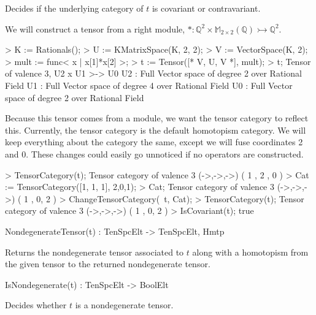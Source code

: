 Decides if the underlying category of $t$ is covariant or contravariant.

\begin{example}[TensorCatProps]

We will construct a tensor from a right module, 
$*:\mathbb{Q}^2 \times \mathbb{M}_{2\times 2}(\mathbb{Q})\rightarrowtail \mathbb{Q}^2$.
\begin{code}
> K := Rationals();
> U := KMatrixSpace(K, 2, 2);
> V := VectorSpace(K, 2);
> mult := func< x | x[1]*x[2] >;
> t := Tensor([* V, U, V *], mult);
> t;
Tensor of valence 3, U2 x U1 >-> U0
U2 : Full Vector space of degree 2 over Rational Field
U1 : Full Vector space of degree 4 over Rational Field
U0 : Full Vector space of degree 2 over Rational Field
\end{code}

Because this tensor comes from a module, we want the tensor category to reflect this.
Currently, the tensor category is the default homotopism category.
We will keep everything about the category the same, except we will fuse coordinates 2 and 0.
These changes could easily go unnoticed if no operators are constructed.
\begin{code}
> TensorCategory(t);
Tensor category of valence 3 (->,->,->) ({ 1 },{ 2 },{ 0 })
> Cat := TensorCategory([1, 1, 1], {{2,0},{1}});
> Cat;
Tensor category of valence 3 (->,->,->) ({ 1 },{ 0, 2 })
> ChangeTensorCategory(~t, Cat);
> TensorCategory(t);
Tensor category of valence 3 (->,->,->) ({ 1 },{ 0, 2 })
> IsCovariant(t);
true
\end{code}
\end{example}

\begin{intrinsics}
NondegenerateTensor(t) : TenSpcElt -> TenSpcElt, Hmtp
\end{intrinsics}

Returns the nondegenerate tensor associated to $t$ along with a homotopism 
from the given tensor to the returned nondegenerate tensor.

\begin{intrinsics}
IsNondegenerate(t) : TenSpcElt -> BoolElt
\end{intrinsics}

Decides whether $t$ is a nondegenerate tensor.


